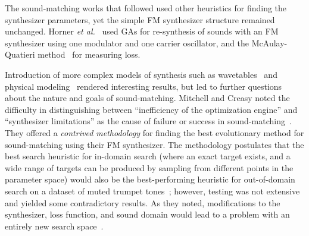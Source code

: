 \documentclass[lettersize,journal]{IEEEtran}
\begin{document}
 The sound-matching works that followed used other heuristics for finding the synthesizer parameters, yet the simple FM synthesizer structure remained unchanged. Horner \textit{et al.}~\cite{horner1993machine} used GAs for re-synthesis of sounds with an FM synthesizer using one modulator and one carrier oscillator, and the McAulay-Quatieri method~\cite{mcaulay1986speech} for measuring loss. 
 

Introduction of more complex models of synthesis such as wavetables~\cite{horner2003auto} and physical modeling~\cite{riionheimo2003parameter} rendered interesting results, but led to further questions about the nature and goals of sound-matching. Mitchell and Creasy noted the difficulty in distinguishing between ``inefficiency of the optimization engine'' and ``synthesizer limitations'' as the cause of failure or success in sound-matching~\cite{mitchell2007evolutionary}. They offered a \textit{contrived methodology} for finding the best evolutionary method for sound-matching using their FM synthesizer. The methodology postulates that the best search heuristic for in-domain search (where an exact target exists, and a wide range of targets can be produced by sampling from different points in the parameter space) would also be the best-performing heuristic for out-of-domain search on a dataset of muted trumpet tones~\cite{opolko1989mcgill}; however, testing was not extensive and yielded some contradictory results. As they noted, modifications to the synthesizer, loss function, and sound domain would lead to a problem with an entirely new search space~\cite{mitchell2007evolutionary}. 

\end{document}

